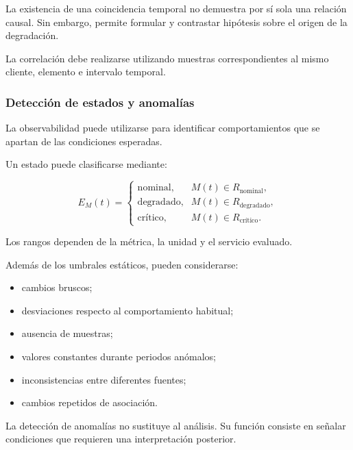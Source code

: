 La existencia de una coincidencia temporal no demuestra por sí sola una
relación causal. Sin embargo, permite formular y contrastar hipótesis
sobre el origen de la degradación.

La correlación debe realizarse utilizando muestras correspondientes al
mismo cliente, elemento e intervalo temporal.


\subsubsection*{Detección de estados y anomalías}

La observabilidad puede utilizarse para identificar comportamientos que
se apartan de las condiciones esperadas.

Un estado puede clasificarse mediante:

\[
    E_M(t)
    =
    \begin{cases}
        \text{nominal}, &
        M(t)
        \in
        R_{\mathrm{nominal}},\\
        \text{degradado}, &
        M(t)
        \in
        R_{\mathrm{degradado}},\\
        \text{crítico}, &
        M(t)
        \in
        R_{\mathrm{crítico}}.
    \end{cases}
\]

Los rangos dependen de la métrica, la unidad y el servicio evaluado.

Además de los umbrales estáticos, pueden considerarse:

\begin{itemize}
    \item cambios bruscos;

    \item desviaciones respecto al comportamiento habitual;

    \item ausencia de muestras;

    \item valores constantes durante periodos anómalos;

    \item inconsistencias entre diferentes fuentes;

    \item cambios repetidos de asociación.
\end{itemize}

La detección de anomalías no sustituye al análisis. Su función consiste
en señalar condiciones que requieren una interpretación posterior.


